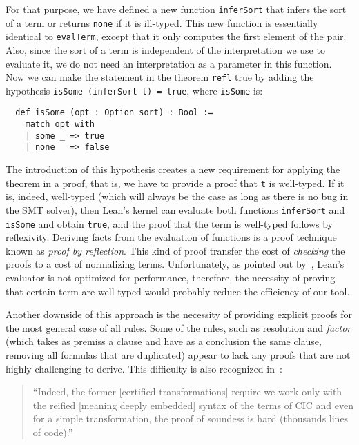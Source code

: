 For that purpose, we have defined a new function \texttt{inferSort} that infers the sort of a term
or returns \texttt{none} if it is ill-typed.
This new function is essentially identical to
\texttt{evalTerm}, except that it only computes the first element of the pair.
Also, since the sort of a term is independent of the interpretation we use
to evaluate it, we do not need an interpretation as a parameter in this function.
Now we can make the statement in the theorem \texttt{refl} true by adding the hypothesis
\texttt{isSome (inferSort t) = true}, where \texttt{isSome} is:

\begin{verbatim}
  def isSome (opt : Option sort) : Bool :=
    match opt with
    | some _ => true
    | none   => false
\end{verbatim}

The introduction of this hypothesis creates a new requirement for applying
the theorem in a proof, that is, we have to provide a proof that \texttt{t} is well-typed.
If it is, indeed, well-typed (which will always be the case as long
as there is no bug in the SMT solver), then Lean's kernel can evaluate
both functions \texttt{inferSort} and \texttt{isSome} and obtain \texttt{true},
and the proof that the term is well-typed follows by reflexivity. Deriving facts
from the evaluation of functions is a proof technique known as \textit{proof by reflection}.
This kind of proof transfer the cost of \textit{checking} the proofs to a cost of
normalizing terms. Unfortunately, as pointed out by~\cite{ringLean}, Lean's evaluator
is not optimized for performance, therefore, the necessity of proving that certain term are
well-typed would probably reduce the efficiency of our tool.

Another downside of this approach is the necessity of providing explicit proofs for the most
general case of all rules. Some of the rules, such as resolution and
\textit{factor} (which takes as premiss a clause and have as a conclusion the same clause, removing
all formulas that are duplicated) appear to lack any proofs that are not highly challenging to derive.
This difficulty is also recognized in~\cite[p. 6]{snipe}:
\begin{quote}
  ``Indeed, the former [certified transformations] require we work only with the reified [meaning deeply embedded] syntax of the
  terms of CIC and even for a simple transformation, the proof of soundess is hard (thousands lines of code).''
\end{quote}

